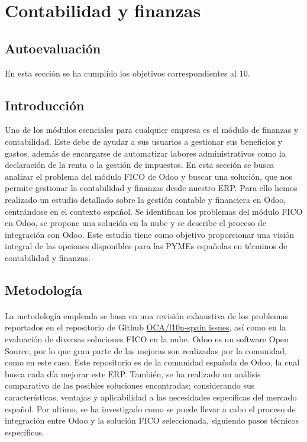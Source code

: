 \section{Contabilidad y finanzas}
\subsection{Autoevaluación}
En esta sección se ha cumplido los objetivos correspondientes al 10.
\subsection{Introducción}
Uno de los módulos esenciales para cualquier empresa es el módulo de finanzas y contabilidad. Este debe de ayudar a sus usuarios a gestionar sus beneficios y gastos, además de encargarse de automatizar labores administrativos como la declaración de la renta o la gestión de impuestos. En esta sección se busca analizar el problema del módulo FICO de Odoo y buscar una solución, que nos permite gestionar la contabilidad y finanzas desde nuestro ERP. Para ello hemos realizado un estudio detallado sobre la gestión contable y financiera en Odoo, centrándose en el contexto español. Se identifican los problemas del módulo FICO en Odoo, se propone una solución en la nube y se describe el proceso de integración con Odoo. Este estudio tiene como objetivo proporcionar una visión integral de las opciones disponibles para las PYMEs españolas en términos de contabilidad y finanzas.
\subsection{Metodología}
\paragraph{}
La metodología empleada se basa en una revisión exhaustiva de los problemas reportados en el repositorio de Github \href{https://github.com/OCA/l10n-spain/issues}{OCA/l10n-spain issues}, así como en la evaluación de diversas soluciones FICO en la nube. Odoo es un software Open Source, por lo que gran parte de las mejoras son realizadas por la comunidad, como en este caso. Este repositorio es de la comunidad española de Odoo, la cual busca cada día mejorar este ERP. También, se ha realizado un análisis comparativo de las posibles soluciones encontradas; considerando sus características, ventajas y aplicabilidad a las necesidades específicas del mercado español. Por ultimo, se ha investigado como se puede llevar a cabo el proceso de integración entre Odoo y la solución FICO seleccionada, siguiendo pasos técnicos específicos.

